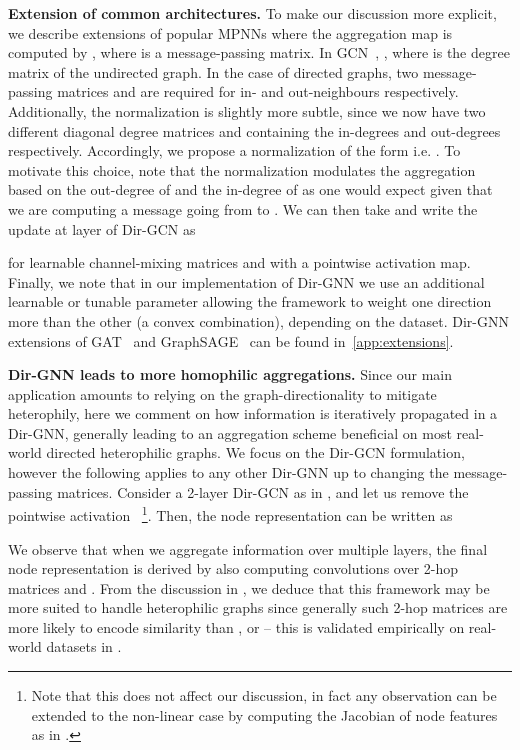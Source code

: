 \documentclass{article}
\newcommand\oursacro{Dir-GNN}
\theoremstyle{plain}
\theoremstyle{definition}
\theoremstyle{remark}
\begin{document}
\textbf{Extension of common architectures.}
To make our discussion more explicit, we describe extensions of popular MPNNs where the aggregation map is computed by \smash{}, where  is a message-passing matrix. In GCN~\cite{kipf2016semi}, \smash{}, where  is the degree matrix of the undirected graph. In the case of directed graphs, two message-passing matrices  and  are required for in- and out-neighbours respectively. Additionally, the normalization is slightly more subtle, since we now have two different diagonal degree matrices  and  containing the in-degrees and out-degrees respectively. Accordingly, we propose a normalization of the form  i.e. . To motivate this choice, note that the normalization modulates the aggregation based on the out-degree of  and the in-degree of  as one would expect given that we are computing a message going from  to . We can then take  and write the update at layer  of Dir-GCN as 

\noindent for learnable channel-mixing matrices  and with  a pointwise activation map. Finally, we note that in our implementation of \oursacro{} we use an additional learnable or tunable parameter  allowing the framework to weight one direction more than the other (a convex combination), depending on the dataset. \oursacro{} extensions of GAT~\cite{velivckovic2017graph} and GraphSAGE~\cite{hamilton2017inductive} can be found in~\cref{app:extensions}. 

\textbf{\oursacro{} leads to more homophilic aggregations.} Since our main application amounts to relying on the graph-directionality to mitigate heterophily, here we comment on how information is iteratively propagated in a \oursacro{}, generally leading to an aggregation scheme beneficial on most real-world directed heterophilic graphs. We focus on the Dir-GCN formulation, however the following applies to any other \oursacro{} up to changing the message-passing matrices. Consider a 2-layer Dir-GCN as in , and let us remove the pointwise activation ~\footnote{Note that this does not affect our discussion, in fact any observation can be extended to the non-linear case by computing the Jacobian of node features as in \citet{topping2021understanding}.}. Then, the node representation can be written as 

\noindent We observe that when we aggregate information over multiple layers, the final node representation is derived by also computing convolutions over 2-hop matrices  and . From the discussion in , we deduce that this framework may be more suited to handle heterophilic graphs since generally such 2-hop matrices are more likely to encode similarity than ,  or  -- this is validated empirically on real-world datasets in .
\end{document}
